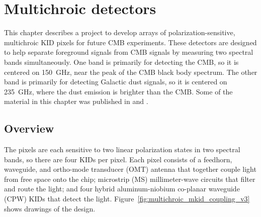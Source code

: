 \chapter{Multichroic detectors}
\label{chp:multichroic}

This chapter describes a project to develop arrays of polarization-sensitive, multichroic KID pixels for future CMB experiments.
These detectors are designed to help separate foreground signals from CMB signals by measuring two spectral bands simultaneously.
One band is primarily for detecting the CMB, so it is centered on \SI{150}{GHz}, near the peak of the CMB black body spectrum.
The other band is primarily for detecting Galactic dust signals, so it is centered on \SI{235}{GHz}, where the dust emission is brighter than the CMB.
Some of the material in this chapter was published in \textcite{Johnson2016SPIE} and \textcite{Johnson2017arXiv}.


\section{Overview}
\label{sec:multichroic.overview}

The pixels are each sensitive to two linear polarization states in two spectral bands, so there are four KIDs per pixel.
Each pixel consists of a feedhorn, waveguide, and ortho-mode transducer (OMT) antenna that together couple light from free space onto the chip; microstrip (MS) millimeter-wave circuits that filter and route the light; and four hybrid aluminum-niobium co-planar waveguide (CPW) KIDs that detect the light.
Figure~\ref{fig:multichroic_mkid_coupling_v3} shows drawings of the design.

